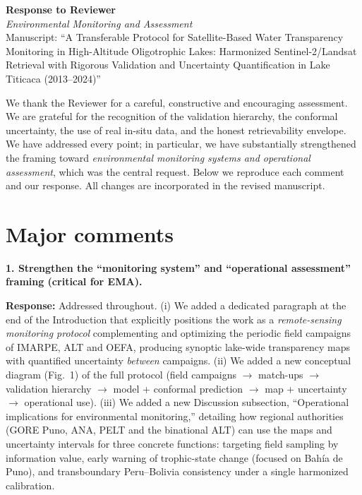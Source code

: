 \documentclass[11pt]{article}
\newcommand{\resp}[1]{\par\noindent\textcolor{blue!60!black}{\textbf{Response:}} #1\par\medskip}
\begin{document}
\begin{center}
{\large\textbf{Response to Reviewer}}\\[0.3em]
\textit{Environmental Monitoring and Assessment}\\[0.2em]
Manuscript: ``A Transferable Protocol for Satellite-Based Water Transparency
Monitoring in High-Altitude Oligotrophic Lakes: Harmonized Sentinel-2/Landsat
Retrieval with Rigorous Validation and Uncertainty Quantification in Lake Titicaca
(2013--2024)''
\end{center}

We thank the Reviewer for a careful, constructive and encouraging assessment. We
are grateful for the recognition of the validation hierarchy, the conformal
uncertainty, the use of real in-situ data, and the honest retrievability envelope.
We have addressed every point; in particular, we have substantially strengthened
the framing toward \emph{environmental monitoring systems and operational
assessment}, which was the central request. Below we reproduce each comment and our
response. All changes are incorporated in the revised manuscript.

\hrulefill

\section*{Major comments}

\textbf{1. Strengthen the ``monitoring system'' and ``operational assessment''
framing (critical for EMA).}
\resp{Addressed throughout. (i) We added a dedicated paragraph at the end of the
Introduction that explicitly positions the work as a \emph{remote-sensing
monitoring protocol} complementing and optimizing the periodic field campaigns of
IMARPE, ALT and OEFA, producing synoptic lake-wide transparency maps with quantified
uncertainty \emph{between} campaigns. (ii) We added a new conceptual diagram
(Fig.~1) of the full protocol (field campaigns $\to$ match-ups $\to$ validation
hierarchy $\to$ model + conformal prediction $\to$ map + uncertainty $\to$
operational use). (iii) We added a new Discussion subsection, ``Operational
implications for environmental monitoring,'' detailing how regional authorities
(GORE Puno, ANA, PELT and the binational ALT) can use the maps and uncertainty
intervals for three concrete functions: targeting field sampling by information
value, early warning of trophic-state change (focused on Bah\'ia de Puno), and
transboundary Peru--Bolivia consistency under a single harmonized calibration.}
\end{document}
